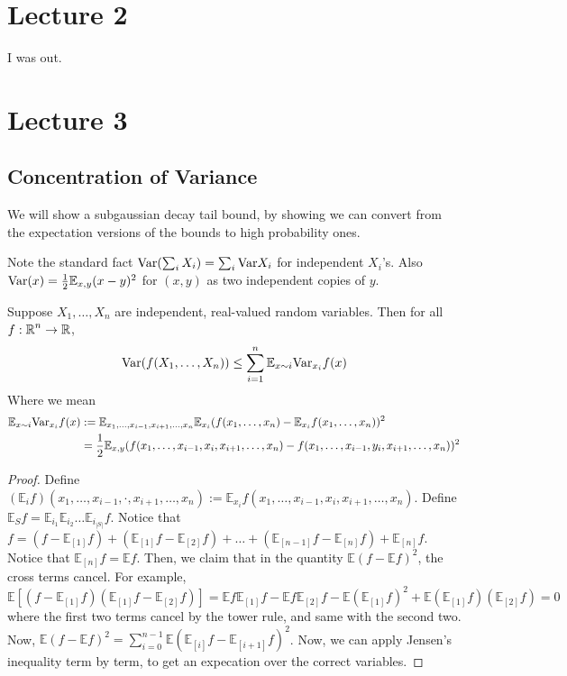 \newcommand{\Exp}{\mathbb{E}}
\section{Lecture 2}
I was out.

\section{Lecture 3}
\subsection{Concentration of Variance}
We will show a subgaussian decay tail bound,
by showing we can convert from the expectation versions of the bounds to
high probability ones.

Note the standard fact $\text{Var}(\sum_i X_i) = \sum_i \text{Var}{X_i}$
for independent $X_i$'s. Also $\Var(x) = \frac{1}{2} \Exp_{x, y} (x - y)^2$
for $(x, y)$ as two independent copies of $y$.

\begin{theorem}
    Suppose $X_1, \dots, X_n$ are independent, real-valued random variables.
    Then for all $f: \operatorname{\mathbb{R}}^n \to \operatorname{\mathbb{R}}$,
    \[ \text{Var}(f(X_1, \dots, X_n)) \le \sum_{i = 1}^{n} \mathbb{E}_{x \sim i} \text{Var}_{x_i} f(x) \]
    Where we mean
    \begin{align*}
        \mathbb{E}_{x \sim i} \Var_{x_i} f(x) &:= \mathbb{E}_{x_1, \dots, x_{i - 1}, x_{i + 1}, \dots, x_n} \Exp_{x_i} (f(x_1, \dots, x_n) - \Exp_{x_i} f(x_1, \dots, x_n))^2 \\
        &= \frac{1}{2} \Exp_{x, y} (f(x_1, \dots, x_{i - 1}, x_i, x_{i + 1}, \dots, x_n) - f(x_1, \dots, x_{i - 1}, y_i, x_{i + 1}, \dots, x_n))^2
    \end{align*}

    \begin{proof}
        Define $(\Exp_i f)(x_1, \dots, x_{i - 1}, \cdot, x_{i + 1}, \dots, x_n) := \Exp_{x_i} f(x_1, \dots, x_{i - 1}, x_i, x_{i + 1}, \dots, x_n)$.
        Define $\Exp_{S} f = \Exp_{i_1} \Exp_{i_2} \dots \Exp_{i_{|S|}} f$.
        Notice that $f = (f - \Exp_{[1]} f) + (\Exp_{[1]} f - \Exp_{[2]} f) + \dots + (\Exp_{[n - 1]} f - \Exp_{[n]} f) + \Exp_{[n]} f$.
        Notice that $\Exp_{[n]} f = \Exp f$. Then, we claim that in the quantity $\Exp(f - \Exp f)^2$, the cross terms cancel.
        For example, 
        \[ \Exp [(f - \Exp_{[1]} f)(\Exp_{[1]} f - \Exp_{[2]} f)] = \Exp f \Exp_{[1]} f - \Exp f \Exp_{[2]} f - \Exp (\Exp_{[1]} f)^2 + \Exp(\Exp_{[1]} f)(\Exp_{[2]} f) = 0\]
        where the first two terms cancel by the tower rule, and same with the second two. Now,
        $\Exp(f - \Exp f)^2 = \sum_{i = 0}^{n - 1} \Exp(\Exp_{[i]} f - \Exp_{[i + 1]} f)^2$.
        Now, we can apply Jensen's inequality term by term, to get an expecation over the correct variables.
    \end{proof}
\end{theorem}


